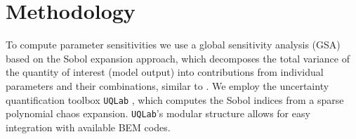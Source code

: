 \documentclass[11pt]{article}
\begin{document}









\section{Methodology}
To compute parameter sensitivities we use a global sensitivity analysis (GSA) based on the Sobol expansion approach, which decomposes the total variance of the quantity of interest (model output) into contributions from individual parameters and their combinations, similar to \cite{Echeverria2017,Rinker2016}. We employ the uncertainty quantification toolbox \texttt{UQLab} \cite{uqlab}, which computes the Sobol indices from a sparse polynomial chaos expansion. \texttt{UQLab}'s modular structure allows for easy integration with available BEM codes. 
\end{document}
